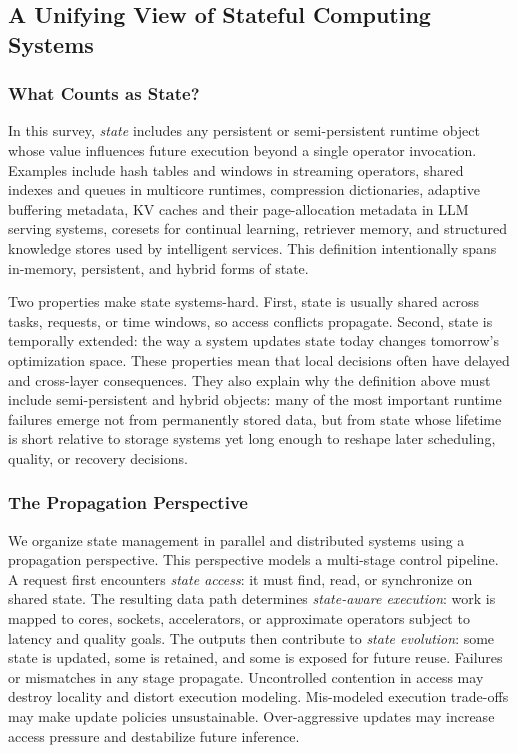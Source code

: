 \documentclass[acmsmall,screen,review]{acmart}
\newcommand{\sysproblem}{state management in parallel and distributed systems\xspace}
\begin{document}
\subsection{A Unifying View of Stateful Computing Systems}

\subsubsection{What Counts as State?}

In this survey, \emph{state} includes any persistent or semi-persistent runtime object whose value influences future execution beyond a single operator invocation. Examples include hash tables and windows in streaming operators, shared indexes and queues in multicore runtimes, compression dictionaries, adaptive buffering metadata, KV caches and their page-allocation metadata in LLM serving systems, coresets for continual learning, retriever memory, and structured knowledge stores used by intelligent services. This definition intentionally spans in-memory, persistent, and hybrid forms of state.

Two properties make state systems-hard. First, state is usually shared across tasks, requests, or time windows, so access conflicts propagate. Second, state is temporally extended: the way a system updates state today changes tomorrow's optimization space. These properties mean that local decisions often have delayed and cross-layer consequences. They also explain why the definition above must include semi-persistent and hybrid objects: many of the most important runtime failures emerge not from permanently stored data, but from state whose lifetime is short relative to storage systems yet long enough to reshape later scheduling, quality, or recovery decisions.

\subsubsection{The Propagation Perspective}

We organize \sysproblem using a propagation perspective. This perspective models a multi-stage control pipeline. A request first encounters \emph{state access}: it must find, read, or synchronize on shared state. The resulting data path determines \emph{state-aware execution}: work is mapped to cores, sockets, accelerators, or approximate operators subject to latency and quality goals. The outputs then contribute to \emph{state evolution}: some state is updated, some is retained, and some is exposed for future reuse. Failures or mismatches in any stage propagate. Uncontrolled contention in access may destroy locality and distort execution modeling. Mis-modeled execution trade-offs may make update policies unsustainable. Over-aggressive updates may increase access pressure and destabilize future inference.
\end{document}
